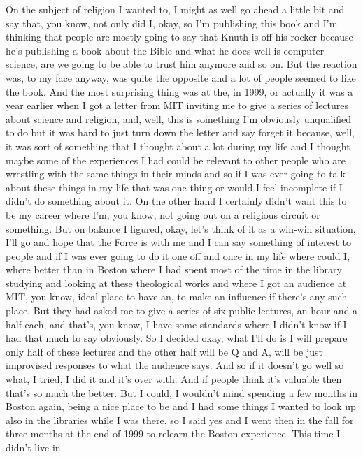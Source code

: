 \documentclass[]{article}
\begin{document}
On the subject of religion I wanted to, I might as well go ahead a
little bit and say that, you know, not only did I, okay, so I'm
publishing this book and I'm thinking that people are mostly going to
say that Knuth is off his rocker because he's publishing a book about
the Bible and what he does well is computer science, are we going to be
able to trust him anymore and so on. But the reaction was, to my face
anyway, was quite the opposite and a lot of people seemed to like the
book. And the most surprising thing was at the, in 1999, or actually it
was a year earlier when I got a letter from MIT inviting me to give a
series of lectures about science and religion, and, well, this is
something I'm obviously unqualified to do but it was hard to just turn
down the letter and say forget it because, well, it was sort of
something that I thought about a lot during my life and I thought maybe
some of the experiences I had could be relevant to other people who are
wrestling with the same things in their minds and so if I was ever going
to talk about these things in my life that was one thing or would I feel
incomplete if I didn't do something about it. On the other hand I
certainly didn't want this to be my career where I'm, you know, not
going out on a religious circuit or something. But on balance I figured,
okay, let's think of it as a win-win situation, I'll go and hope that
the Force is with me and I can say something of interest to people and
if I was ever going to do it one off and once in my life where could I,
where better than in Boston where I had spent most of the time in the
library studying and looking at these theological works and where I got
an audience at MIT, you know, ideal place to have an, to make an
influence if there's any such place. But they had asked me to give a
series of six public lectures, an hour and a half each, and that's, you
know, I have some standards where I didn't know if I had that much to
say obviously. So I decided okay, what I'll do is I will prepare only
half of these lectures and the other half will be Q and A, will be just
improvised responses to what the audience says. And so if it doesn't go
well so what, I tried, I did it and it's over with. And if people think
it's valuable then that's so much the better. But I could, I wouldn't
mind spending a few months in Boston again, being a nice place to be and
I had some things I wanted to look up also in the libraries while I was
there, so I said yes and I went then in the fall for three months at the
end of 1999 to relearn the Boston experience. This time I didn't live in
\end{document}
